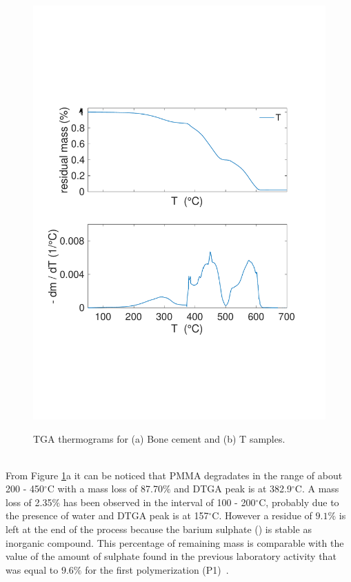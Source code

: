 \documentclass[a4paper, 11pt]{article}
\begin{document}
\begin{figure}[htp]
{\includegraphics[scale=0.3]{tgaT}} 
\captionsetup{justification=centering}
\caption{TGA thermograms for (a) Bone cement and (b) T samples.}
\label{fig:tga}
\end{figure}\\
From Figure \ref{fig:tga}a it can be noticed that PMMA degradates in the range of about 200 - 450$^\circ$C with a mass loss of 87.70$\%$ and DTGA peak is at 382.9$^\circ$C. A mass loss of 2.35$\%$ has been observed in the interval of 100 - 200$^\circ$C, probably due to the presence of water and DTGA peak is at 157$^\circ$C. However a residue of $9.1\%$ is left at the end of the process because the barium sulphate () is stable as inorganic compound. This percentage of remaining mass is comparable with the value of the amount of sulphate found in the previous laboratory activity that was equal to $9.6\%$ for the first polymerization (P1)~\cite{gruppo1}. 
\end{document}
